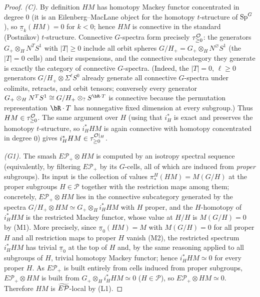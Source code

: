 \begin{proof}
\emph{(C).} By definition $HM$ has homotopy Mackey functor concentrated in
degree $0$ (it is an Eilenberg--MacLane object for the homotopy
$t$-structure of $\mathrm{Sp}^G$), so $\underline\pi_k(HM)=0$ for $k<0$; hence $HM$ is
connective in the standard (Postnikov) $t$-structure. Connective $G$-spectra
form precisely $\tau^{\mathcal{O}}_{\ge 0}$: the generators $G_+\otimes_H N^TS^1$ with
$|T|\ge 0$ include all orbit spheres $G/H_+=G_+\otimes_H N^{\varnothing}S^1$ (the
$|T|=0$ cells) and their suspensions, and the connective subcategory they
generate is exactly the category of connective $G$-spectra. (Indeed, the
$|T|=0$, $\ell\ge 0$ generators $G/H_+\otimes\Sigma^\ell S^0$ already generate all
connective $G$-spectra under colimits, retracts, and orbit tensors; conversely
every generator $G_+\otimes_H N^TS^1\cong G/H_+\otimes_? S^{\bR\cdot T}$ is
connective because the permutation representation $\bR\cdot T$ has nonnegative
fixed dimension at every subgroup.) Thus $HM\in\tau^{\mathcal{O}}_{\ge 0}$. The same
argument over $H$ (using that $i_H^\ast$ is exact and preserves the homotopy
$t$-structure, so $i_H^\ast HM$ is again connective with homotopy concentrated in
degree $0$) gives $i_H^\ast HM\in\tau^{\mathcal{O}|_H}_{\ge 0}$.

\emph{(G1).} The smash $E\mathcal P_+\otimes HM$ is computed by an isotropy
spectral sequence (equivalently, by filtering $E\mathcal P_+$ by its $G$-cells,
all of which are induced from \emph{proper} subgroups). Its input is the
collection of values $\pi_\ast^H(HM)=M(G/H)$ at the proper subgroups $H\in\mathcal
P$ together with the restriction maps among them; concretely,
$E\mathcal P_+\otimes HM$ lies in the connective subcategory generated by the
spectra $G/H_+\otimes HM\simeq G_+\otimes_H i_H^\ast HM$ with $H$ proper, and the
$H$-homotopy of $i_H^\ast HM$ is the restricted Mackey functor, whose value at
$H/H$ is $M(G/H)=0$ by (M1). More precisely, since $\underline\pi_0(HM)=M$ with
$M(G/H)=0$ for all proper $H$ and all restriction maps to proper $H$ vanish
(M2), the restricted spectrum $i_H^\ast HM$ has trivial $\underline\pi_0$ at the
top of $H$ and, by the same reasoning applied to all subgroups of $H$, trivial
homotopy Mackey functor; hence $i_H^\ast HM\simeq 0$ for every proper $H$. As
$E\mathcal P_+$ is built entirely from cells induced from proper subgroups,
$E\mathcal P_+\otimes HM$ is built from $G_+\otimes_H i_H^\ast HM\simeq 0$
($H\in\mathcal P$), so $E\mathcal P_+\otimes HM\simeq 0$. Therefore $HM$ is
$\widetilde{E\mathcal P}$-local by (L1).


\end{proof}
